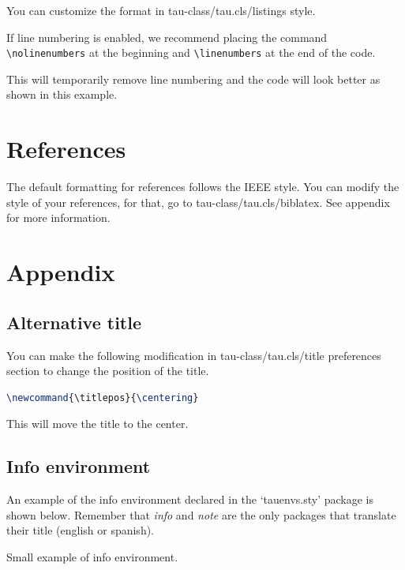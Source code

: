 \documentclass[9pt,a4paper,twoside]{tau-class/tau}
\begin{document}
    You can customize the format in tau-class/tau.cls/listings style.
	
	\nolinenumbers
	
	\linenumbers
	
    If line numbering is enabled, we recommend placing the command \verb|\nolinenumbers| at the beginning and \verb|\linenumbers| at the end of the code. 
	
    This will temporarily remove line numbering and the code will look better as shown in this example.
	
\section{References}

    The default formatting for references follows the IEEE style. 
    You can modify the style of your references, for that, go to tau-class/tau.cls/biblatex. 
    See appendix for more information.
	
\section{Appendix}

    \subsection{Alternative title}

        You can make the following modification in tau-class/tau.cls/title preferences section to change the position of the title.

\nolinenumbers
\begin{lstlisting}[language=TeX, caption=Alternative title.]
\newcommand{\titlepos}{\centering}
\end{lstlisting}
\linenumbers

	This will move the title to the center. 

    \subsection{Info environment}

        An example of the info environment declared in the ‘tauenvs.sty’ package is shown below. Remember that \textit{info} and \textit{note} are the only packages that translate their title (english or spanish).
		
	\begin{info}
		Small example of info environment.
	\end{info}
\end{document}
